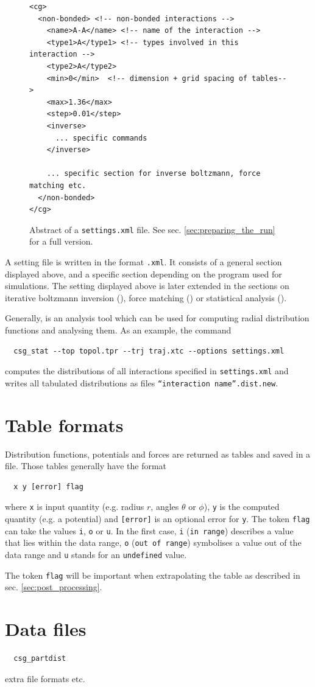 \begin{figure}[h]
\centering
\begin{lstlisting}[frame=single]
<cg>
  <non-bonded> <!-- non-bonded interactions -->
    <name>A-A</name> <!-- name of the interaction -->
    <type1>A</type1> <!-- types involved in this interaction -->
    <type2>A</type2>
    <min>0</min>  <!-- dimension + grid spacing of tables-->
    <max>1.36</max>
    <step>0.01</step>
    <inverse>
      ... specific commands
    </inverse>

    ... specific section for inverse boltzmann, force matching etc.
  </non-bonded>
</cg>
\end{lstlisting}
\caption{Abstract of a \texttt{settings.xml} file. See sec. \ref{sec:preparing_the_run} for a full version.}
\end{figure}

A setting file is written in the format \texttt{.xml}. It consists of a general section displayed above, and a specific section depending on the program used for simulations. The setting displayed above is later extended in the sections on iterative boltzmann inversion (), force matching () or statistical analysis ().

Generally,  is an analysis tool which can be used for computing radial distribution functions and analysing them. As an example, the command

\begin{verbatim}
  csg_stat --top topol.tpr --trj traj.xtc --options settings.xml
\end{verbatim}

computes the distributions of all interactions specified in \texttt{settings.xml} and writes all tabulated distributions as files \texttt{``interaction name''.dist.new}.

\section{Table formats}
\label{sec:table_formats}
Distribution functions, potentials and forces are returned as tables and saved in a file. Those tables generally have the format
\begin{verbatim}
  x y [error] flag
\end{verbatim}
where \texttt{x} is input quantity (e.g. radius $r$, angles $\theta$ or $\phi$), \texttt{y} is the computed quantity (e.g. a potential) and \texttt{[error]} is an optional error for \texttt{y}. The token \texttt{flag} can take the values \texttt{i}, \texttt{o} or \texttt{u}.
In the first case, \texttt{i} (\texttt{in range}) describes a value that lies within the data range, \texttt{o} (\texttt{out of range}) symbolises a value out of the data range and \texttt{u} stands for an \texttt{undefined} value.

The token \texttt{flag} will be important when extrapolating the table as described in sec. \ref{sec:post_processing}.

\section{Data files}
\label{sec:data_files}
\begin{verbatim}
  csg_partdist
\end{verbatim}
extra file formats etc. \todo